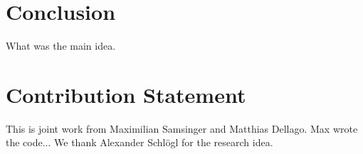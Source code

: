 \documentclass{article}
\begin{document}
\section{Conclusion}
What was the main idea.

\section{Contribution Statement}

This is joint work from Maximilian Samsinger and Matthias Dellago. Max wrote the code... %
We thank Alexander Schlögl for the research idea.


\end{document}
